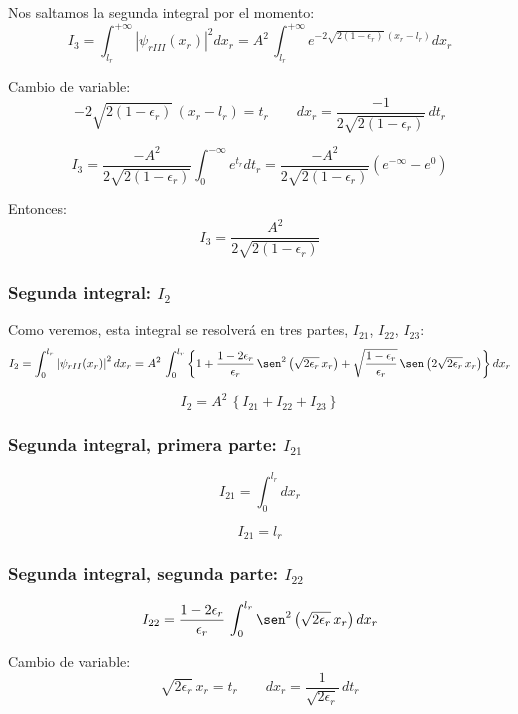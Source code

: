 Nos saltamos la segunda integral por el momento:
\[
I_3 = \int_{l_r}^{+\infty}\left|\psi_{rIII}(x_r)\right|^2 dx_r 
= 
A^2\,\int_{l_r}^{+\infty} e^{-2\sqrt{2(1-\epsilon_r)}\,(x_r-l_r)} dx_r
\]

Cambio de variable:
\[
-2\sqrt{2(1-\epsilon_r)}\,(x_r-l_r) = t_r
\hspace{2em}
dx_r = \frac{-1}{2\sqrt{2(1-\epsilon_r)}}\,dt_r
\]

\[
I_3
= \frac{-A^2}{2\sqrt{2(1-\epsilon_r)}}\int_{0}^{-\infty} e^{t_r} dt_r
= \frac{-A^2}{2\sqrt{2(1-\epsilon_r)}}(e^{-\infty}-e^{0})
\]

Entonces:
\begin{equation}
\label{I3}
I_3 = \frac{A^2}{2\sqrt{2(1-\epsilon_r)}}
\end{equation}

\subsubsection{Segunda integral: $I_2$}

Como veremos, esta integral se resolverá en tres partes,
$I_{21}$, $I_{22}$, $I_{23}$:
\[
I_2 = \int_{0}^{l_r}\left|\psi_{rII}(x_r)\right|^2 dx_r 
= 
A^2\,\int_{0}^{l_r}
\left\lbrace
1
 + \frac{1-2\epsilon_r}{\epsilon_r}\,\sen^2\left(\sqrt{2\epsilon_r}\,x_r\right)
 + \sqrt{\frac{1-\epsilon_r}{\epsilon_r}}\,\sen\left(2\sqrt{2\epsilon_r}\,x_r\right)
\right\rbrace
dx_r
\]

\[
I_2 = A^2\,\left\lbrace I_{21} + I_{22} + I_{23}\right\rbrace
\]

\subsubsection{Segunda integral, primera parte: $I_{21}$}

\[
I_{21}
= 
\int_{0}^{l_r} dx_r
\]

\begin{equation}
\label{I21}
I_{21} = l_r
\end{equation}

\subsubsection{Segunda integral, segunda parte: $I_{22}$}

\[
I_{22}
= 
\frac{1-2\epsilon_r}{\epsilon_r}\,
\int_{0}^{l_r}\sen^2\left(\sqrt{2\epsilon_r}\,x_r\right) dx_r
\]

Cambio de variable:
\[
\sqrt{2\epsilon_r}\,x_r = t_r
\hspace{2em}
dx_r = \frac{1}{\sqrt{2\epsilon_r}}\,dt_r
\]

